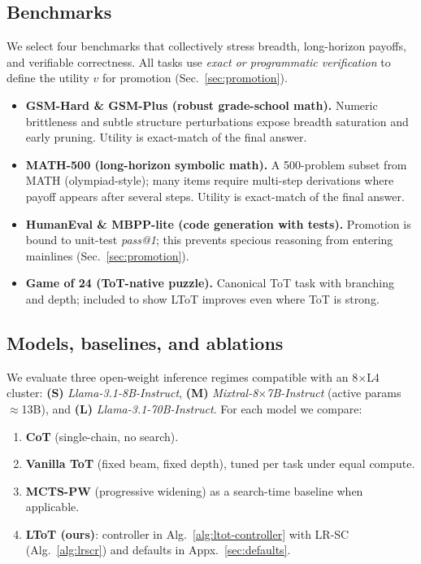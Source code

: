 \documentclass{article}
\begin{document}
\subsection{Benchmarks}
\label{subsec:benchmarks}
We select four benchmarks that collectively stress breadth, long-horizon payoffs, and verifiable correctness.
All tasks use \emph{exact or programmatic verification} to define the utility $v$ for promotion (Sec.~\ref{sec:promotion}).

\begin{itemize}[leftmargin=*, itemsep=2pt, topsep=2pt]
    \item \textbf{GSM-Hard \& GSM-Plus (robust grade-school math).}
    Numeric brittleness and subtle structure perturbations expose breadth saturation and early pruning.
    Utility is exact-match of the final answer.
    \item \textbf{MATH-500 (long-horizon symbolic math).}
    A 500-problem subset from MATH (olympiad-style); many items require multi-step derivations where payoff appears after several steps.
    Utility is exact-match of the final answer.
    \item \textbf{HumanEval \& MBPP-lite (code generation with tests).}
    Promotion is bound to unit-test \emph{pass@1}; this prevents specious reasoning from entering mainlines (Sec.~\ref{sec:promotion}).
    \item \textbf{Game of 24 (ToT-native puzzle).}
    Canonical ToT task with branching and depth; included to show LToT improves even where ToT is strong.
\end{itemize}




\subsection{Models, baselines, and ablations}
\label{subsec:baselines}
We evaluate three open-weight inference regimes compatible with an 8$\times$L4 cluster:
\textbf{(S)} \emph{Llama-3.1-8B-Instruct},
\textbf{(M)} \emph{Mixtral-8$\times$7B-Instruct} (active params $\approx$13B), and
\textbf{(L)} \emph{Llama-3.1-70B-Instruct}.
For each model we compare:

\begin{enumerate}[leftmargin=*, itemsep=2pt, topsep=2pt]
    \item \textbf{CoT} (single-chain, no search).
    \item \textbf{Vanilla ToT} (fixed beam, fixed depth), tuned per task under equal compute.
    \item \textbf{MCTS-PW} (progressive widening) as a search-time baseline when applicable.
    \item \textbf{LToT (ours)}: controller in Alg.~\ref{alg:ltot-controller} with LR-SC (Alg.~\ref{alg:lrscr}) and defaults in Appx.~\ref{sec:defaults}.
\end{enumerate}
\end{document}
